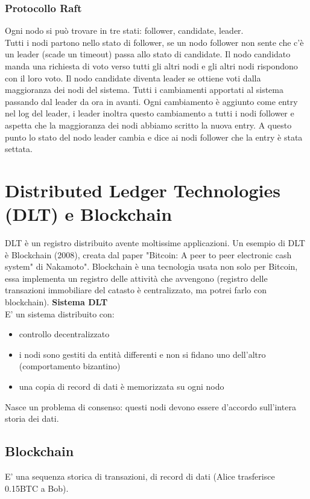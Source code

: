 \documentclass[12pt,italian]{report}
\begin{document}
\subsection{Protocollo Raft}
Ogni nodo si può trovare in tre stati: follower, candidate, leader. \\ Tutti i nodi partono nello stato di follower, se un nodo follower non sente che c'è un leader (scade un timeout) passa allo stato di candidate. Il nodo candidato manda una richiesta di voto verso tutti gli altri nodi e gli altri nodi rispondono con il loro voto. Il nodo candidate diventa leader se ottiene voti dalla maggioranza dei nodi del sistema. Tutti i cambiamenti apportati al sistema passando dal leader da ora in avanti. Ogni cambiamento è aggiunto come entry nel log del leader, i leader inoltra questo cambiamento a tutti i nodi follower e aspetta che la maggioranza dei nodi abbiamo scritto la nuova entry. A questo punto lo stato del nodo leader cambia e dice ai nodi follower che la entry è stata settata. 

\chapter{Distributed Ledger Technologies (DLT) e Blockchain}
DLT è un registro distribuito avente moltissime applicazioni. Un esempio di DLT è Blockchain (2008), creata dal paper "Bitcoin: A peer to peer electronic cash system" di Nakamoto". Blockchain è una tecnologia usata non solo per Bitcoin, essa implementa un registro delle attività che avvengono (registro delle transazioni immobiliare del catasto è centralizzato, ma potrei farlo con blockchain). 
\bigbreak
\noindent \textbf{Sistema DLT} \\
E' un sistema distribuito con:
\begin{itemize}
    \item controllo decentralizzato
    \item i nodi sono gestiti da entità differenti e non si fidano uno dell'altro (comportamento bizantino)
    \item una copia di record di dati è memorizzata su ogni nodo
\end{itemize}
Nasce un problema di consenso: questi nodi devono essere d'accordo sull'intera storia dei dati. 

\section{Blockchain}
E' una sequenza storica di transazioni, di record di dati (Alice trasferisce 0.15BTC a Bob). 
\bigbreak
\end{document}

